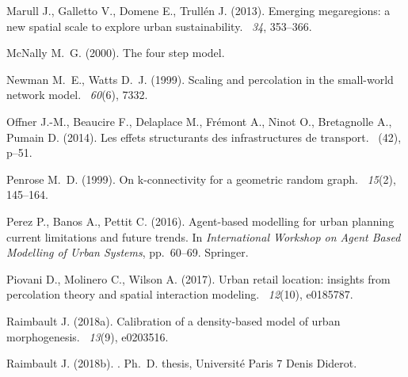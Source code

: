 \documentclass{jimis-en}
\begin{document}
\begin{thebibliography}{}
Marull J., Galletto V., Domene E., Trull{\'e}n J. (2013).
\newblock Emerging megaregions: a new spatial scale to explore urban
  sustainability.
~{\em 34}, 353--366.


McNally M.~G. (2000).
\newblock The four step model.


Newman M.~E., Watts D.~J. (1999).
\newblock Scaling and percolation in the small-world network model.
~{\em 60\/}(6), 7332.


Offner J.-M., Beaucire F., Delaplace M., Fr{\'e}mont A., Ninot O., Bretagnolle
  A., Pumain D. (2014).
\newblock Les effets structurants des infrastructures de transport.
~(42), p--51.


Penrose M.~D. (1999).
\newblock On k-connectivity for a geometric random graph.
~{\em 15\/}(2), 145--164.


Perez P., Banos A., Pettit C. (2016).
\newblock Agent-based modelling for urban planning current limitations and
  future trends.
\newblock In {\em International Workshop on Agent Based Modelling of Urban
  Systems}, pp.\  60--69. Springer.


Piovani D., Molinero C., Wilson A. (2017).
\newblock Urban retail location: insights from percolation theory and spatial
  interaction modeling.
~{\em 12\/}(10), e0185787.


Raimbault J. (2018a).
\newblock Calibration of a density-based model of urban morphogenesis.
~{\em 13\/}(9), e0203516.


Raimbault J. (2018b).
.
\newblock Ph.\ D. thesis, Universit{\'e} Paris 7 Denis Diderot.



\end{thebibliography}
\end{document}
